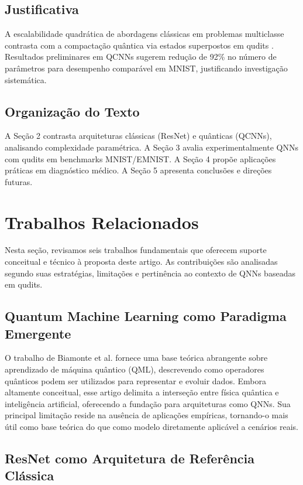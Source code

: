 \documentclass[12pt]{article}
\begin{document}
\subsection{Justificativa}
A escalabilidade quadrática de abordagens clássicas em problemas multiclasse \cite{Abbas2020} contrasta com a compactação quântica via estados superpostos em qudits \cite{Gao2017}. Resultados preliminares em QCNNs \cite{Li2020} sugerem redução de 92\% no número de parâmetros para desempenho comparável em MNIST, justificando investigação sistemática.

\subsection{Organização do Texto}
A Seção 2 contrasta arquiteturas clássicas (ResNet) e quânticas (QCNNs), analisando complexidade paramétrica. A Seção 3 avalia experimentalmente QNNs com qudits em benchmarks MNIST/EMNIST. A Seção 4 propõe aplicações práticas em diagnóstico médico. A Seção 5 apresenta conclusões e direções futuras.

\section{Trabalhos Relacionados}

Nesta seção, revisamos seis trabalhos fundamentais que oferecem suporte conceitual e técnico à proposta deste artigo. As contribuições são analisadas segundo suas estratégias, limitações e pertinência ao contexto de QNNs baseadas em qudits.

\subsection{Quantum Machine Learning como Paradigma Emergente}

O trabalho de Biamonte et al. \cite{Biamonte2017} fornece uma base teórica abrangente sobre aprendizado de máquina quântico (QML), descrevendo como operadores quânticos podem ser utilizados para representar e evoluir dados. Embora altamente conceitual, esse artigo delimita a interseção entre física quântica e inteligência artificial, oferecendo a fundação para arquiteturas como QNNs. Sua principal limitação reside na ausência de aplicações empíricas, tornando-o mais útil como base teórica do que como modelo diretamente aplicável a cenários reais.


\subsection{ResNet como Arquitetura de Referência Clássica}
\end{document}
